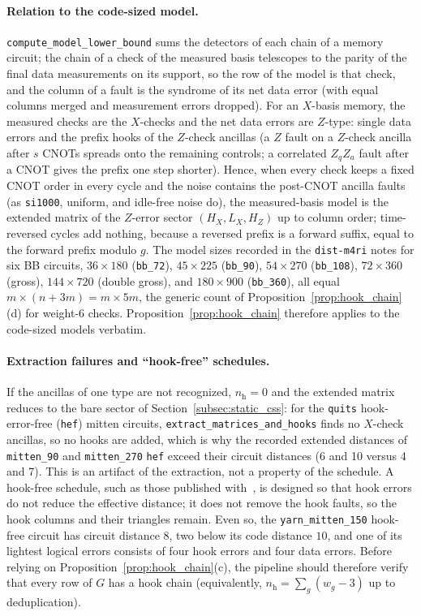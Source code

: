 \documentclass[12pt]{article}
\theoremstyle{definition}
\newcommand{\ttt}[1]{\texttt{#1}}
\begin{document}
\paragraph{Relation to the code-sized model.}
\ttt{compute\_model\_lower\_bound} sums the detectors of each chain of a memory circuit; the chain of a check of the
measured basis telescopes to the parity of the final data measurements on its support, so the row of the model is
that check, and the column of a fault is the syndrome of its net data error (with equal columns merged and
measurement errors dropped). For an $X$-basis memory, the measured checks are the $X$-checks and the net data errors
are $Z$-type: single data errors and the prefix hooks of the $Z$-check ancillas (a $Z$ fault on a $Z$-check ancilla
after $s$ CNOTs spreads onto the remaining controls; a correlated $Z_q Z_a$ fault after a CNOT gives the prefix one
step shorter). Hence, when every check keeps a fixed CNOT order in every cycle and the noise contains the post-CNOT
ancilla faults (as \ttt{si1000}, uniform, and idle-free noise do), the measured-basis model is the extended matrix of
the $Z$-error sector $(H_X, L_X, H_Z)$ up to column order; time-reversed cycles add nothing, because a reversed
prefix is a forward suffix, equal to the forward prefix modulo $g$. The model sizes recorded in the \ttt{dist-m4ri}
notes for six BB circuits, $36 \times 180$ (\ttt{bb\_72}), $45 \times 225$ (\ttt{bb\_90}), $54 \times 270$
(\ttt{bb\_108}), $72 \times 360$ (gross), $144 \times 720$ (double gross), and $180 \times 900$ (\ttt{bb\_360}), all
equal $m \times (n + 3m) = m \times 5m$, the generic count of Proposition~\ref{prop:hook_chain}(d) for weight-6
checks. Proposition~\ref{prop:hook_chain} therefore applies to the code-sized models verbatim.

\paragraph{Extraction failures and ``hook-free'' schedules.}
If the ancillas of one type are not recognized, $n_{\mathrm{h}} = 0$ and the extended matrix reduces to the bare
sector of Section~\ref{subsec:static_css}: for the \ttt{quits} hook-error-free (\ttt{hef}) mitten circuits,
\ttt{extract\_matrices\_and\_hooks} finds no $X$-check ancillas, so no hooks are added, which is why the recorded
extended distances of \ttt{mitten\_90} and \ttt{mitten\_270} \ttt{hef} exceed their circuit distances (6 and 10 versus
4 and 7). This is an artifact of the extraction, not a property of the schedule. A hook-free schedule, such as those
published with~\cite{Bhardwaj2026Mitten}, is designed so that hook errors do not reduce the effective distance; it
does not remove the hook faults, so the hook columns and their triangles remain. Even so, the \ttt{yarn\_mitten\_150}
hook-free circuit has circuit distance $8$, two below its code distance $10$, and one of its lightest logical errors
consists of four hook errors and four data errors. Before relying on Proposition~\ref{prop:hook_chain}(c), the
pipeline should therefore verify that every row of $G$ has a hook chain (equivalently, $n_{\mathrm{h}} = \sum_g (w_g -
3)$ up to deduplication).
\end{document}

